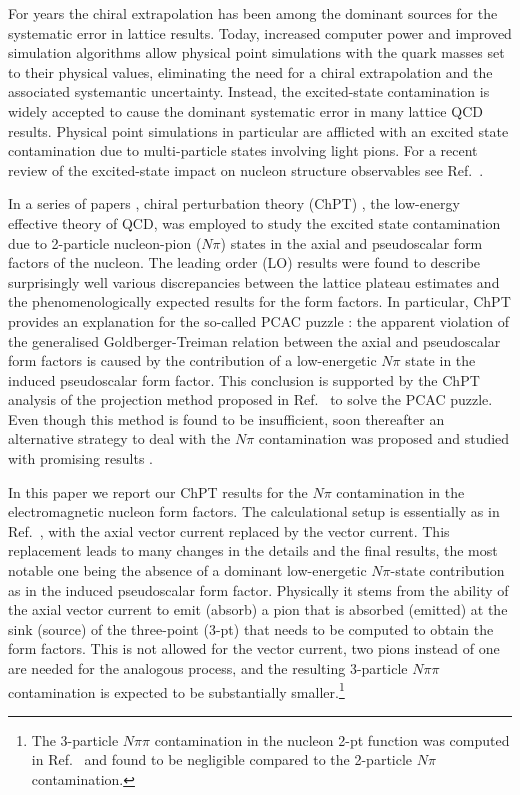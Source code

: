 \documentclass[11pt,prd,aps,showpacs,eqsecnum,floatfix,nofootinbib,preprint,tightenlines]{revtex4}
\begin{document}
For years the chiral extrapolation  has been among the dominant sources for the systematic error in lattice results. Today, increased computer power and improved simulation algorithms allow physical point simulations with the quark masses set to their physical values, eliminating the need for a chiral extrapolation and the associated systemantic uncertainty. Instead, the excited-state contamination is widely accepted to cause the dominant systematic error in many lattice QCD results. Physical point simulations in particular are afflicted with an excited state contamination due to multi-particle states involving light pions. For a recent review of the excited-state impact on nucleon structure observables see Ref.\ \cite{Ottnad:2020qbw}.

In a series of papers \cite{Bar:2018xyi,Bar:2019gfx,Bar:2019igf}, chiral perturbation theory (ChPT) \cite{Weinberg:1978kz,Gasser:1983yg,Gasser:1984gg}, the low-energy effective theory of QCD, was employed to study the  excited state contamination due to 2-particle nucleon-pion ($N\pi$) states in the axial and pseudoscalar form factors of the nucleon. The leading order (LO) results were found to describe surprisingly well various discrepancies between the lattice plateau estimates and the phenomenologically expected results for the form factors. In particular, ChPT provides an explanation for the so-called PCAC puzzle \cite{Rajan:2017lxk,Bali:2018qus}: the apparent violation of the generalised Goldberger-Treiman relation between the axial and pseudoscalar form factors is caused by the contribution of a low-energetic $N\pi$ state in the induced pseudoscalar form factor.
This conclusion is supported by the ChPT analysis \cite{Bar:2019igf} of the projection method proposed in Ref.\ \cite{Bali:2018qus} to solve the PCAC puzzle. Even though this method is found to be insufficient, soon thereafter an alternative strategy to deal with the $N\pi$ contamination was proposed and studied with promising results \cite{Jang:2019vkm,Bali:2019yiy}.

In this paper we report our ChPT results for the $N\pi$ contamination in the electromagnetic nucleon form factors. The calculational setup is essentially as in Ref.\ \cite{Bar:2018xyi}, with the axial vector current replaced by the vector current. This replacement leads to many changes in the details and the final results, the most notable one being the absence of a dominant low-energetic $N\pi$-state contribution as in the induced pseudoscalar form factor. Physically it stems from the ability of the axial vector current to emit (absorb) a pion that is absorbed (emitted) at the sink (source) of the three-point (3-pt) that needs to be computed to obtain the form factors. This is not allowed for the vector current, two pions instead of one are needed for the analogous process, and the resulting 3-particle $N\pi\pi$ contamination is expected to be substantially smaller.\footnote{The 3-particle $N\pi\pi$ contamination in the nucleon 2-pt function was computed in Ref.\ \cite{Bar:2018wco} and found to be negligible compared to the 2-particle $N\pi$ contamination.} 
\end{document}
